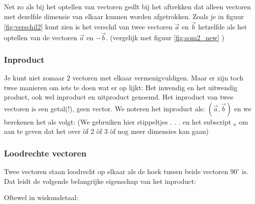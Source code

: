 
Net zo als bij het  optellen van vectoren gedlt bij het aftrekken dat alleen vectoren met dezelfde dimensie van elkaar kunnen worden afgetrokken. 
Zoals je in figuur \ref{fig:verschil2} kunt zien is het verschil van twee vectoren $  \vec{a}  $  en $  \vec{b}  $ hetzelfde als het optellen van de vectoren $  \vec{a}  $  en $ - \vec{b}  $. (vergelijk met figuur  \ref{fig:som2_new} )


\subsubsection{Inproduct}
Je kunt niet zomaar $2$ vectoren met elkaar vermenigvuldigen. Maar er zijn toch twee manieren om iets te doen wat er op lijkt: Het inwendig en het uitwendig product, ook wel inproduct en uitproduct genoemd. 
Het inproduct van twee vectoren is een getal(!), geen vector. We noteren het inproduct als: $(\vec{a}, \vec{b}) $ en we berekenen het als volgt: (We gebruiken hier stippeltjes . . .  en het subscript $_n$ om aan te geven dat het over òf $2$ òf $3$ òf nog meer dimensies kan gaan)




\subsubsection{Loodrechte vectoren}
Twee vectoren staan loodrecht op elkaar als de hoek tussen beide vectoren $ 90^{\circ} $ is. Dat leidt de volgende belangrijke eigenschap van het inproduct: 


Oftewel in wiskundetaal: 

